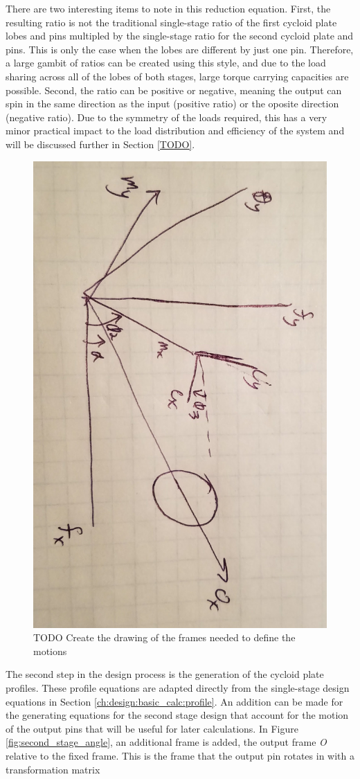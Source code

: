 There are two interesting items to note in this reduction equation. First, the resulting ratio is not the traditional single-stage ratio of the first cycloid plate lobes and pins multipled by the single-stage ratio for the second cycloid plate and pins. This is only the case when the lobes are different by just one pin. Therefore, a large gambit of ratios can be created using this style, and due to the load sharing across all of the lobes of both stages, large torque carrying capacities are possible. Second, the ratio can be positive or negative, meaning the output can spin in the same direction as the input (positive ratio) or the oposite direction (negative ratio). Due to the symmetry of the loads required, this has a very minor practical impact to the load distribution and efficiency of the system and will be discussed further in Section \ref{TODO}. 

\begin{figure}[h]
	\centering
	\includegraphics[angle=90,width=0.50\linewidth]{fig/two_stage_frames_TODO}
   \caption{TODO Create the drawing of the frames needed to define the motions}
   \label{fig:two_stage_frame}
\end{figure}

The second step in the design process is the generation of the cycloid plate profiles. These profile equations are adapted directly from the single-stage design equations in Section \ref{ch:design:basic_calc:profile}. An addition can be made for the generating equations for the second stage design that account for the motion of the output pins that will be useful for later calculations. In Figure \ref{fig:second_stage_angle}, an additional frame is added, the output frame \textit{O} relative to the fixed frame. This is the frame that the output pin rotates in with a transformation matrix 

